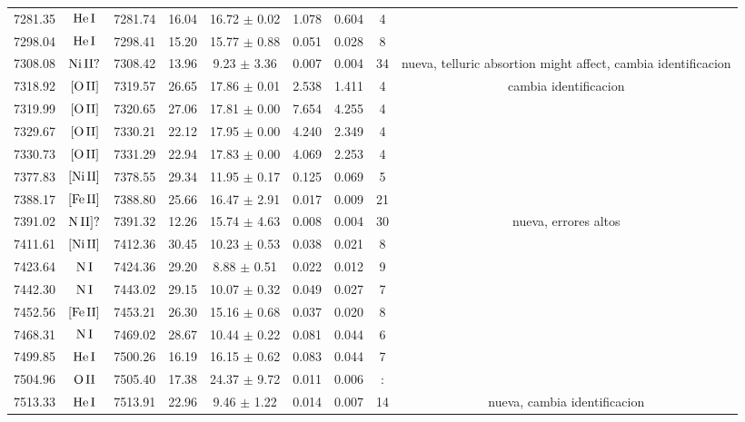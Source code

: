 \documentclass{article}
\begin{document}
\begin{table*}
\begin{adjustbox}{width=\textwidth}
\begin{tabular}{ccccccccc}
7281.35 & $\mbox{He}\thinspace \mbox{I}$ & 7281.74 & 16.04 & 16.72 $\pm$ 0.02 & 1.078 & 0.604 & 4 &  \\
7298.04 & $\mbox{He}\thinspace \mbox{I}$ & 7298.41 & 15.20 & 15.77 $\pm$ 0.88 & 0.051 & 0.028 & 8 &  \\
7308.08 & $\mbox{Ni}\thinspace \mbox{II?}$ & 7308.42 & 13.96 & 9.23 $\pm$ 3.36 & 0.007 & 0.004 & 34 &  nueva, telluric absortion might affect, cambia identificacion \\
7318.92 & $\mbox{[O}\thinspace \mbox{II]}$ & 7319.57 & 26.65 & 17.86 $\pm$ 0.01 & 2.538 & 1.411 & 4 &  cambia identificacion \\
7319.99 & $\mbox{[O}\thinspace \mbox{II]}$ & 7320.65 & 27.06 & 17.81 $\pm$ 0.00 & 7.654 & 4.255 & 4 &  \\
7329.67 & $\mbox{[O}\thinspace \mbox{II]}$ & 7330.21 & 22.12 & 17.95 $\pm$ 0.00 & 4.240 & 2.349 & 4 &  \\
7330.73 & $\mbox{[O}\thinspace \mbox{II]}$ & 7331.29 & 22.94 & 17.83 $\pm$ 0.00 & 4.069 & 2.253 & 4 &  \\
7377.83 & $\mbox{[Ni}\thinspace \mbox{II]}$ & 7378.55 & 29.34 & 11.95 $\pm$ 0.17 & 0.125 & 0.069 & 5 &  \\
7388.17 & $\mbox{[Fe}\thinspace \mbox{II]}$ & 7388.80 & 25.66 & 16.47 $\pm$ 2.91 & 0.017 & 0.009 & 21 &  \\
7391.02 & $\mbox{N}\thinspace \mbox{II]?}$ & 7391.32 & 12.26 & 15.74 $\pm$ 4.63 & 0.008 & 0.004 & 30 &  nueva, errores altos \\
7411.61 & $\mbox{[Ni}\thinspace \mbox{II]}$ & 7412.36 & 30.45 & 10.23 $\pm$ 0.53 & 0.038 & 0.021 & 8 &  \\
7423.64 & $\mbox{N}\thinspace \mbox{I}$ & 7424.36 & 29.20 & 8.88 $\pm$ 0.51 & 0.022 & 0.012 & 9 &  \\
7442.30 & $\mbox{N}\thinspace \mbox{I}$ & 7443.02 & 29.15 & 10.07 $\pm$ 0.32 & 0.049 & 0.027 & 7 &  \\
7452.56 & $\mbox{[Fe}\thinspace \mbox{II]}$ & 7453.21 & 26.30 & 15.16 $\pm$ 0.68 & 0.037 & 0.020 & 8 &  \\
7468.31 & $\mbox{N}\thinspace \mbox{I}$ & 7469.02 & 28.67 & 10.44 $\pm$ 0.22 & 0.081 & 0.044 & 6 &  \\
7499.85 & $\mbox{He}\thinspace \mbox{I}$ & 7500.26 & 16.19 & 16.15 $\pm$ 0.62 & 0.083 & 0.044 & 7 &  \\
7504.96 & $\mbox{O}\thinspace \mbox{II}$ & 7505.40 & 17.38 & 24.37 $\pm$ 9.72 & 0.011 & 0.006 & : &  \\
7513.33 & $\mbox{He}\thinspace \mbox{I}$ & 7513.91 & 22.96 & 9.46 $\pm$ 1.22 & 0.014 & 0.007 & 14 &  nueva, cambia identificacion \\

\end{tabular}
\end{adjustbox}
\end{table*}
\end{document}
